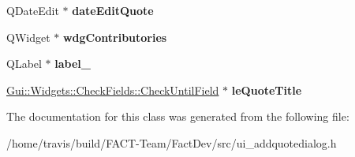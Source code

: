 \begin{DoxyCompactItemize}
\item 
\hypertarget{classUi__AddQuoteDialog_a5f039c0bea3b79748d93370b7854d56d}{Q\-Date\-Edit $\ast$ {\bfseries date\-Edit\-Quote}}\label{classUi__AddQuoteDialog_a5f039c0bea3b79748d93370b7854d56d}

\item 
\hypertarget{classUi__AddQuoteDialog_a45f35a429188caab905a2ab6c9237f50}{Q\-Widget $\ast$ {\bfseries wdg\-Contributories}}\label{classUi__AddQuoteDialog_a45f35a429188caab905a2ab6c9237f50}

\item 
\hypertarget{classUi__AddQuoteDialog_a03e66f15519623001a6de0e68a63af2b}{Q\-Label $\ast$ {\bfseries label\-\_}}\label{classUi__AddQuoteDialog_a03e66f15519623001a6de0e68a63af2b}

\item 
\hypertarget{classUi__AddQuoteDialog_ac85e8139616d4996c8d0a3ca2865316a}{\hyperlink{classGui_1_1Widgets_1_1CheckFields_1_1CheckUntilField}{Gui\-::\-Widgets\-::\-Check\-Fields\-::\-Check\-Until\-Field} $\ast$ {\bfseries le\-Quote\-Title}}\label{classUi__AddQuoteDialog_ac85e8139616d4996c8d0a3ca2865316a}

\end{DoxyCompactItemize}


The documentation for this class was generated from the following file\-:\begin{DoxyCompactItemize}
\item 
/home/travis/build/\-F\-A\-C\-T-\/\-Team/\-Fact\-Dev/src/ui\-\_\-addquotedialog.\-h\end{DoxyCompactItemize}
